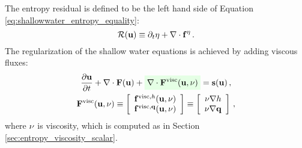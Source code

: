 The entropy residual is defined to be the left hand side of 
Equation \eqref{eq:shallowwater_entropy_equality}:
\begin{equation}
  \mathcal{R}(\mathbf{u}) \equiv \partial_t\eta
  + \nabla\cdot\mathbf{f}^\eta
  \,.
\end{equation}
The regularization of the shallow water equations is achieved by adding
viscous fluxes:
\begin{equation}
\begin{gathered}
  \ppt{\vectorsolution} + \nabla\cdot\consfluxvector
  + \highlightgreen{\nabla\cdot\viscconsfluxvector}
  = \conssource \eqc
\\
  \viscconsfluxvector
  \equiv \left[\begin{array}{c}
    \viscflux{\height}(\vectorsolution,\viscosity)\\
    \viscflux{\heightmomentum}(\vectorsolution,\viscosity)
    \end{array}\right]
  \equiv \left[\begin{array}{c}
    \viscosity\nabla\height\\
    \viscosity\nabla\heightmomentum
    \end{array}\right] \eqc
\end{gathered}
\end{equation}
where $\nu$ is viscosity, which is computed as in Section
\ref{sec:entropy_viscosity_scalar}.
